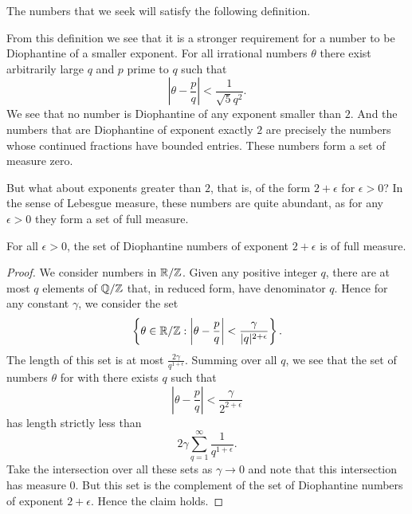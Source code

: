 \documentclass[twoside,letterpaper,11pt]{article}
\numberwithin{equation}{section}
\begin{document}
The numbers that we seek will satisfy the following definition.
\begin{defn}
  \dionumber{}
\end{defn}
From this definition we see that it is a stronger requirement for a number to be
Diophantine of a smaller exponent.
For all irrational numbers $\theta$ there exist arbitrarily large $q$ and $p$
prime to $q$ such that
\begin{equation*}
  \left| \theta - \frac{p}{q} \right| < \frac{1}{\sqrt{5}q^2}.
\end{equation*}
We see that no number is Diophantine of any exponent smaller than $2$.
And the numbers that are Diophantine of exponent exactly $2$ are precisely the
numbers whose continued fractions have bounded entries.
These numbers form a set of measure zero.

But what about exponents greater than $2$, that is, of the form $2 + \epsilon$
for $\epsilon > 0$?
In the sense of Lebesgue measure, these numbers are quite abundant, as for any
$\epsilon > 0$ they form a set of full measure.
\begin{prop}
  \label{prop:dio-num-with-full-meas}
  For all $\epsilon > 0$, the set of Diophantine numbers of exponent $2 +
  \epsilon$ is of full measure.
\end{prop}
\begin{proof}
  We consider numbers in $\mathbb{R} / \mathbb{Z}$.
  Given any positive integer $q$, there are at most $q$ elements of $\mathbb{Q} / \mathbb{Z}$
  that, in reduced form, have denominator $q$.
  Hence for any constant $\gamma$, we consider the set
  \begin{equation*}
    \left\{ \theta \in \mathbb{R} / \mathbb{Z} : \left| \theta - \frac{p}{q} \right| <
      \frac{\gamma}{|q|^{2 + \epsilon}} \right\}.
  \end{equation*}
  The length of this set is at most $\frac{2\gamma}{q^{1 + \epsilon}}$.
  Summing over all $q$, we see that the set of numbers $\theta$ for with there
  exists $q$ such that
  \begin{equation*}
    \left| \theta - \frac{p}{q} \right| < \frac{\gamma}{2^{2 + \epsilon}}
  \end{equation*}
  has length strictly less than
  \begin{equation*}
    2 \gamma \sum_{q = 1}^{\infty} \frac{1}{q^{1 + \epsilon}}.
  \end{equation*}
  Take the intersection over all these sets as $\gamma \to 0$ and note that this
  intersection has measure $0$.
  But this set is the complement of the set of Diophantine numbers of exponent
  $2 + \epsilon$.
  Hence the claim holds.
\end{proof}
\end{document}
